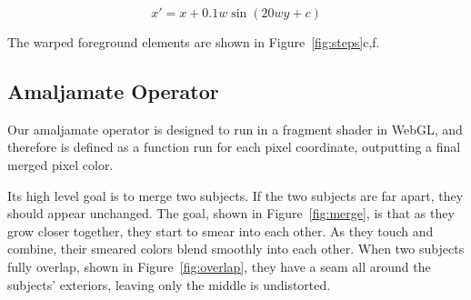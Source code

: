 \documentclass[twocolumn]{article}
\begin{document}
\begin{equation}
    x' = x + 0.1w\sin(20wy+c)
\end{equation}

The warped foreground elements are shown in Figure~\ref{fig:steps}c,f.

\subsection{Amaljamate Operator}

Our amaljamate operator is designed to run in a fragment shader in WebGL, and therefore is defined as a function run for each pixel coordinate, outputting a final merged pixel color.

Its high level goal is to merge two subjects. If the two subjects are far apart, they should appear unchanged. The goal, shown  in Figure~\ref{fig:merge}, is that as they grow closer together, they start to smear into each other. As they touch and combine, their smeared colors blend smoothly into each other. When two subjects fully overlap, shown in Figure~\ref{fig:overlap}, they have a seam all around the subjects' exteriors, leaving only the middle is undistorted.
\end{document}
